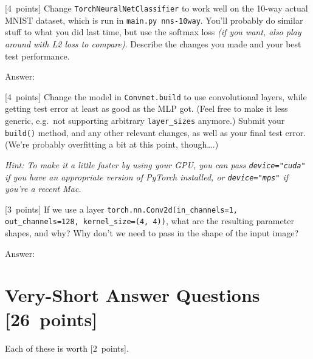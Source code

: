 \documentclass{article}
\newcommand{\ask}[1]{\textcolor{question}{#1}}
\newenvironment{answer}{\par\begingroup\color{answer}Answer: }{\endgroup}
\newcommand{\pts}[1]{\textcolor{points}{[#1~points]}}
\newcommand{\hint}[1]{\textcolor{black!60!white}{\emph{Hint: #1}}}
\newcommand{\meta}[1]{\textcolor{black!60!white}{\emph{#1}}}
\newcommand{\TODO}{\color{red}{TODO}}
\begin{document}
\begin{qlist}
\item \pts{4} Change \texttt{TorchNeuralNetClassifier} to work well on the 10-way actual MNIST dataset, which is run in \texttt{main.py nns-10way}. You'll probably do similar stuff to what you did last time, but use the softmax loss \meta{(if you want, also play around with L2 loss to compare)}. \ask{Describe the changes you made and your best test performance.}

\begin{answer}\TODO\end{answer}

\item \pts{4} Change the model in \texttt{Convnet.build} to use convolutional layers, while getting test error at least as good as the MLP got. (Feel free to make it less generic, e.g.\ not supporting arbitrary \texttt{layer\_sizes} anymore.) \ask{Submit your \texttt{build()} method, and any other relevant changes, as well as your final test error.} (We're probably overfitting a bit at this point, though\dots.)

\hint{To make it a little faster by using your GPU, you can pass \texttt{device="cuda"} if you have an appropriate version of PyTorch installed, or \texttt{device="mps"} if you're a recent Mac.}

\item \pts{3} If we use a layer \texttt{torch.nn.Conv2d(in\_channels=1, out\_channels=128, kernel\_size=(4, 4))}, \ask{what are the resulting parameter shapes, and why? Why don't we need to pass in the shape of the input image?}
\begin{answer}\TODO\end{answer}

\end{qlist}


\pagebreak


\section{Very-Short Answer Questions \pts{26}}

Each of these is worth \pts{2}.
\end{document}
